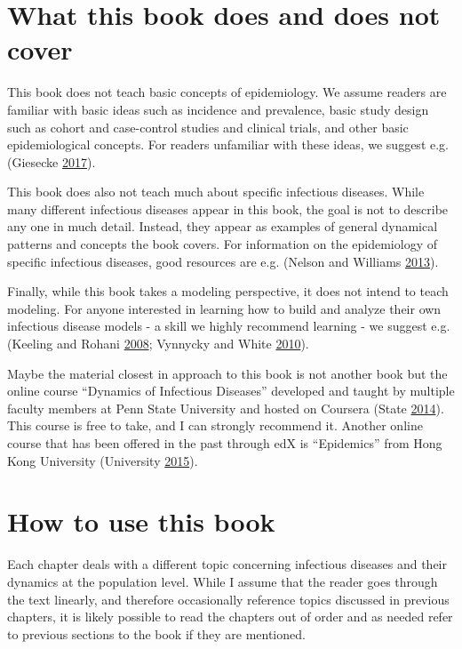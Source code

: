 \documentclass[]{book}
\theoremstyle{definition}
\theoremstyle{definition}
\theoremstyle{definition}
\theoremstyle{remark}
\begin{document}
\section{What this book does and does not
cover}\label{what-this-book-does-and-does-not-cover}

This book does not teach basic concepts of epidemiology. We assume
readers are familiar with basic ideas such as incidence and prevalence,
basic study design such as cohort and case-control studies and clinical
trials, and other basic epidemiological concepts. For readers unfamiliar
with these ideas, we suggest e.g. (Giesecke
\protect\hyperlink{ref-giesecke17}{2017}).

This book does also not teach much about specific infectious diseases.
While many different infectious diseases appear in this book, the goal
is not to describe any one in much detail. Instead, they appear as
examples of general dynamical patterns and concepts the book covers. For
information on the epidemiology of specific infectious diseases, good
resources are e.g. (Nelson and Williams
\protect\hyperlink{ref-nelson13}{2013}).

Finally, while this book takes a modeling perspective, it does not
intend to teach modeling. For anyone interested in learning how to build
and analyze their own infectious disease models - a skill we highly
recommend learning - we suggest e.g. (Keeling and Rohani
\protect\hyperlink{ref-keeling08}{2008}; Vynnycky and White
\protect\hyperlink{ref-vynnycky10}{2010}).

Maybe the material closest in approach to this book is not another book
but the online course ``Dynamics of Infectious Diseases'' developed and
taught by multiple faculty members at Penn State University and hosted
on Coursera (State \protect\hyperlink{ref-epimooc}{2014}). This course
is free to take, and I can strongly recommend it. Another online course
that has been offered in the past through edX is ``Epidemics'' from Hong
Kong University (University \protect\hyperlink{ref-hkepidemics}{2015}).

\section{How to use this book}\label{how-to-use-this-book}

Each chapter deals with a different topic concerning infectious diseases
and their dynamics at the population level. While I assume that the
reader goes through the text linearly, and therefore occasionally
reference topics discussed in previous chapters, it is likely possible
to read the chapters out of order and as needed refer to previous
sections to the book if they are mentioned.
\end{document}
